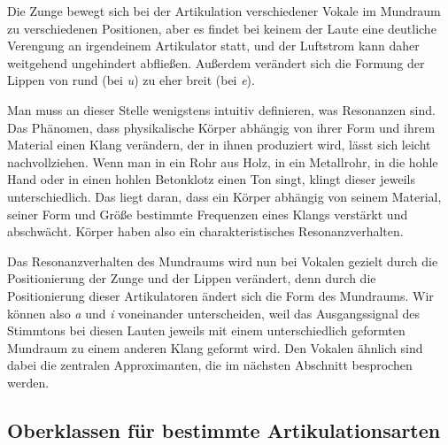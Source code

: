 
Die Zunge bewegt sich bei der Artikulation verschiedener Vokale im Mund\-raum zu verschiedenen Positionen, aber es findet bei keinem der Laute eine deutliche Verengung an irgendeinem Artikulator statt, und der Luftstrom kann daher weitgehend ungehindert abfließen.
Außerdem verändert sich die Formung der Lippen von rund (\zB bei \textit{u}) zu eher breit (\zB bei \textit{e}).



Man muss an dieser Stelle wenigstens intuitiv definieren, was Resonanzen sind.
Das Phänomen, dass physikalische Körper abhängig von ihrer Form und ihrem Material einen Klang verändern, der in ihnen produziert wird, lässt sich leicht nachvollziehen.
Wenn man in ein Rohr aus Holz, in ein Metallrohr, in die hohle Hand oder in einen hohlen Betonklotz einen Ton singt, klingt dieser jeweils unterschiedlich.
Das liegt daran, dass ein Körper abhängig von seinem Material, seiner Form und Größe bestimmte Frequenzen eines Klangs verstärkt und abschwächt.
Körper haben also ein charakteristisches Resonanzverhalten.

Das Resonanzverhalten des Mundraums wird nun bei Vokalen gezielt durch die Positionierung der Zunge und der Lippen verändert, denn durch die Positionierung dieser Artikulatoren ändert sich die Form des Mundraums.
Wir können also \textit{a} und \textit{i} voneinander unterscheiden, weil das Ausgangssignal des Stimmtons bei diesen Lauten jeweils mit einem unterschiedlich geformten Mundraum zu einem anderen Klang geformt wird.
Den Vokalen ähnlich sind dabei die zentralen Approximanten, die im nächsten Abschnitt besprochen werden.

\subsection{Oberklassen für bestimmte Artikulationsarten}

